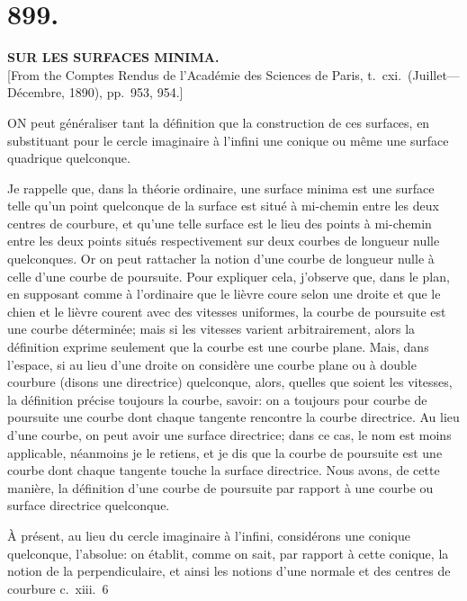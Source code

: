 \documentclass[11pt,a4paper]{book}
\begin{document}
\section*{899.}
\begin{center}
{\large\bfseries SUR LES SURFACES MINIMA.}\\[0.5em]
\small [From the Comptes Rendus de l'Acad\'emie des Sciences de Paris, t.\ cxi.\ (Juillet---D\'ecembre, 1890), pp.\ 953, 954.]
\end{center}

ON peut g\'en\'eraliser tant la d\'efinition que la construction de ces surfaces, en substituant pour le cercle imaginaire \`a l'infini une conique ou m\^eme une surface quadrique quelconque.

Je rappelle que, dans la th\'eorie ordinaire, une surface minima est une surface telle qu'un point quelconque de la surface est situ\'e \`a mi-chemin entre les deux centres de courbure, et qu'une telle surface est le lieu des points \`a mi-chemin entre les deux points situ\'es respectivement sur deux courbes de longueur nulle quelconques. Or on peut rattacher la notion d'une courbe de longueur nulle \`a celle d'une courbe de poursuite. Pour expliquer cela, j'observe que, dans le plan, en supposant comme \`a l'ordinaire que le li\`evre coure selon une droite et que le chien et le li\`evre courent avec des vitesses uniformes, la courbe de poursuite est une courbe d\'etermin\'ee; mais si les vitesses varient arbitrairement, alors la d\'efinition exprime seulement que la courbe est une courbe plane. Mais, dans l'espace, si au lieu d'une droite on consid\`ere une courbe plane ou \`a double courbure (disons une directrice) quelconque, alors, quelles que soient les vitesses, la d\'efinition pr\'ecise toujours la courbe, savoir: on a toujours pour courbe de poursuite une courbe dont chaque tangente rencontre la courbe directrice. Au lieu d'une courbe, on peut avoir une surface directrice; dans ce cas, le nom est moins applicable, n\'eanmoins je le retiens, et je dis que la courbe de poursuite est une courbe dont chaque tangente touche la surface directrice. Nous avons, de cette mani\`ere, la d\'efinition d'une courbe de poursuite par rapport \`a une courbe ou surface directrice quelconque.

\`A pr\'esent, au lieu du cercle imaginaire \`a l'infini, consid\'erons une conique quelconque, l'absolue: on \'etablit, comme on sait, par rapport \`a cette conique, la notion de la perpendiculaire, et ainsi les notions d'une normale et des centres de courbure c.\ xiii.\ 6
\end{document}
